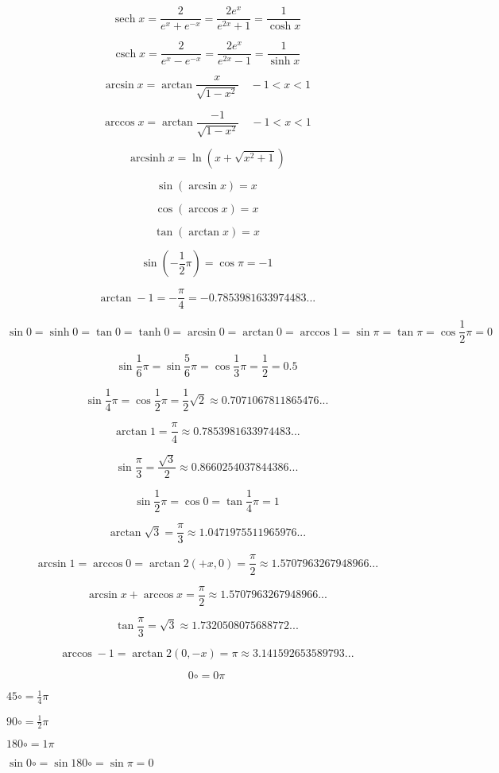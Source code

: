 \documentclass{article}
\DeclareMathOperator{\csch}{csch}
\DeclareMathOperator{\sech}{sech}
\DeclareMathOperator{\arcsinh}{arcsinh}
\begin{document}
$$\sech x = \frac{2}{e^x + e^{-x}} = \frac{2e^x}{e^{2x}+1} = \frac{1}{\cosh x}$$

$$\csch x = \frac{2}{e^x - e^{-x}} = \frac{2e^x}{e^{2x}-1} = \frac{1}{\sinh x}$$

$$\arcsin x = \arctan\frac{x}{\sqrt{1-x^2}}
\quad -1 < x < 1$$

$$\arccos x = \arctan\frac{-1}{\sqrt{1-x^2}}\quad -1 < x < 1$$

$$\arcsinh x = \ln(x+\sqrt{x^2+1})$$

$$\sin(\arcsin x) = x$$

$$\cos(\arccos x) = x$$

$$\tan(\arctan x) = x$$

$$\sin(-\frac{1}{2}\pi) = \cos\pi = -1$$

$$\arctan-1 = -\frac{\pi}{4} = -0.7853981633974483...$$

$$\sin0 = \sinh0 = \tan0 = \tanh0 = \arcsin0 = \arctan0 = \arccos1 = \sin\pi =
\tan\pi = \cos\frac{1}{2}\pi = 0$$

$$\sin\frac{1}{6}\pi = \sin\frac{5}{6}\pi = \cos\frac{1}{3}\pi = \frac{1}{2} = 0.5$$

$$\sin\frac{1}{4}\pi = \cos\frac{1}{2}\pi = \frac{1}{2}\sqrt{2}\approx0.7071067811865476...$$

$$\arctan1=\frac{\pi}{4}\approx0.7853981633974483...$$

$$\sin\frac{\pi}{3}=\frac{\sqrt{3}}{2}\approx0.8660254037844386...$$

$$\sin\frac{1}{2}\pi = \cos0 = \tan\frac{1}{4}\pi = 1$$

$$\arctan\sqrt{3} = \frac{\pi}{3}\approx1.0471975511965976...$$

$$\arcsin1 = \arccos0 = \arctan2(+x,0) = \frac{\pi}{2}\approx1.5707963267948966...$$

$$\arcsin x + \arccos x = \frac{\pi}{2} \approx1.5707963267948966...$$

$$\tan\frac{\pi}{3}=\sqrt{3}\approx1.7320508075688772...$$

$$\arccos-1 = \arctan2(0,-x) = \pi\approx3.141592653589793...$$



$$0\circ = 0\pi$$

$45\circ = \frac{1}{4}\pi$

$90\circ = \frac{1}{2}\pi$

$180\circ = 1\pi$

$\sin 0\circ = \sin 180\circ = \sin\pi = 0$
\end{document}
